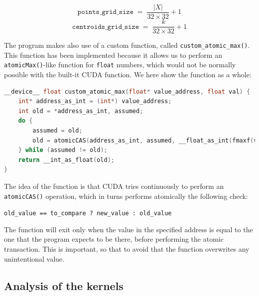 \documentclass[11pt, journal]{IEEEtran}
\newcommand{\nwl}{

\vspace{11pt}

}
\begin{document}
\[ \texttt{points\_grid\_size} \; = \; \frac{\left| X \right|}{32 \times 32} + 1 \]
\[ \texttt{centroids\_grid\_size} \; = \; \frac{k}{32 \times 32} + 1 \]

The program makes also use of a custom function, called \verb|custom_atomic_max()|. This function has been implemented because it allows us to perform an \verb|atomicMax()|-like function for \verb|float| numbers, which would not be normally possible with the built-it CUDA function. We here show the function as a whole:
\nwl
\begin{lstlisting}[language = C]
__device__ float custom_atomic_max(float* value_address, float val) {
    int* address_as_int = (int*) value_address;
    int old = *address_as_int, assumed;
    do {
        assumed = old;
        old = atomicCAS(address_as_int, assumed, __float_as_int(fmaxf(val, __int_as_float(assumed))));
    } while (assumed != old);
    return __int_as_float(old);
}\end{lstlisting}
\nwl
The idea of the function is that CUDA tries continuously to perform an \verb|atomicCAS()| operation, which in turns performs atomically the following check:
\begin{center}
    \scriptsize
    \verb|old_value == to_compare ? new_value : old_value|
\end{center}

The function will exit only when the value in the specified address is equal to the one that the program expects to be there, before performing the atomic transaction. This is important, so that to avoid that the function overwrites any unintentional value.

\subsection{Analysis of the kernels}
\end{document}
